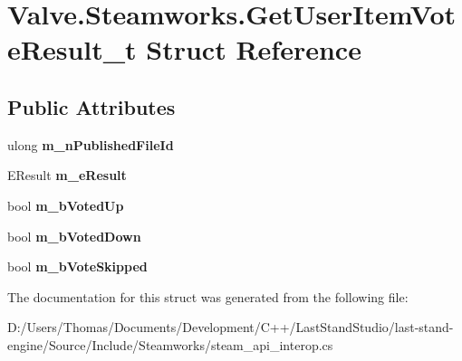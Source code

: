 \hypertarget{structValve_1_1Steamworks_1_1GetUserItemVoteResult__t}{}\section{Valve.\+Steamworks.\+Get\+User\+Item\+Vote\+Result\+\_\+t Struct Reference}
\label{structValve_1_1Steamworks_1_1GetUserItemVoteResult__t}
\subsection*{Public Attributes}
\begin{DoxyCompactItemize}
\item 
\hypertarget{structValve_1_1Steamworks_1_1GetUserItemVoteResult__t_a67f5b3c90d48df53862a535af85356e0}{}ulong {\bfseries m\+\_\+n\+Published\+File\+Id}\label{structValve_1_1Steamworks_1_1GetUserItemVoteResult__t_a67f5b3c90d48df53862a535af85356e0}

\item 
\hypertarget{structValve_1_1Steamworks_1_1GetUserItemVoteResult__t_a395a8448908303f6af20cad975d35543}{}E\+Result {\bfseries m\+\_\+e\+Result}\label{structValve_1_1Steamworks_1_1GetUserItemVoteResult__t_a395a8448908303f6af20cad975d35543}

\item 
\hypertarget{structValve_1_1Steamworks_1_1GetUserItemVoteResult__t_a87a90b4e22f6177d3049aae1bc17f3dd}{}bool {\bfseries m\+\_\+b\+Voted\+Up}\label{structValve_1_1Steamworks_1_1GetUserItemVoteResult__t_a87a90b4e22f6177d3049aae1bc17f3dd}

\item 
\hypertarget{structValve_1_1Steamworks_1_1GetUserItemVoteResult__t_a4b52206425f1bcda8aff1f26b696f3e0}{}bool {\bfseries m\+\_\+b\+Voted\+Down}\label{structValve_1_1Steamworks_1_1GetUserItemVoteResult__t_a4b52206425f1bcda8aff1f26b696f3e0}

\item 
\hypertarget{structValve_1_1Steamworks_1_1GetUserItemVoteResult__t_af77d99eaf47954b68511abd2454098f0}{}bool {\bfseries m\+\_\+b\+Vote\+Skipped}\label{structValve_1_1Steamworks_1_1GetUserItemVoteResult__t_af77d99eaf47954b68511abd2454098f0}

\end{DoxyCompactItemize}


The documentation for this struct was generated from the following file\+:\begin{DoxyCompactItemize}
\item 
D\+:/\+Users/\+Thomas/\+Documents/\+Development/\+C++/\+Last\+Stand\+Studio/last-\/stand-\/engine/\+Source/\+Include/\+Steamworks/steam\+\_\+api\+\_\+interop.\+cs\end{DoxyCompactItemize}
